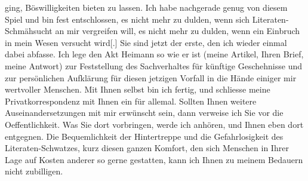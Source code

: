 \begin{ledgroupsized}[t]{13cm}
               ging, Böswilligkeiten bieten zu lassen. Ich habe nachgerade genug von diesem Spiel
               und bin fest entschlossen, es nicht mehr zu dulden, wenn sich Literaten-Schmähsucht
               an mir vergreifen will, es nicht mehr zu dulden, wenn ein Einbruch in mein Wesen
               versucht wird{[}.{]} Sie sind jetzt der erste, den ich wieder einmal
               dabei abfasse.\pend
           \pstart
           Ich lege den Akt Heimann so wie er ist (meine
                  Artikel, Ihren
               Brief, meine Antwort) zur Feststellung des Sachverhaltes für künftige Geschehnisse
               und zur persönlichen Aufklärung für diesen jetzigen Vorfall in die Hände einiger mir
               wertvoller Menschen.\pend
           \pstart
           Mit Ihnen selbst bin ich fertig, und schliesse meine Privatkorrespondenz mit Ihnen
               ein für allemal. Sollten Ihnen weitere Auseinandersetzungen mit mir erwünscht sein,
               dann verweise ich Sie vor die Oeffentlichkeit. Was Sie dort vorbringen, werde ich
               anhören, und Ihnen eben dort entgegnen. Die Bequemlichkeit der Hintertreppe und die
               Gefahrlosigkeit des Literaten-Schwatzes, kurz diesen ganzen Komfort, den sich
               Menschen in Ihrer Lage auf Kosten anderer so gerne gestatten, kann ich Ihnen zu
               meinem Bedauern nicht zubilligen.\pend
           
         
         \endnumbering{}\end{ledgroupsized}  \newcommand{\dateiname}{L03438}\newcommand{\titel}{Felix Salten an Arthur Schnitzler, 20. 4. 1907}\newcommand{\editorInnen}{Martin Anton Müller und Laura Untner}
      